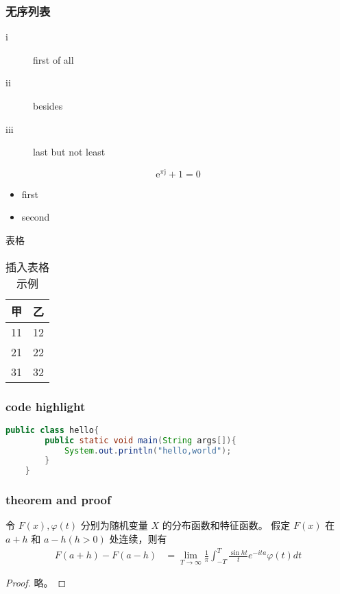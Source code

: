 \documentclass[UTF8]{beamer}
\begin{document}
\begin{frame}
    \frametitle{无序列表}
    \begin{description}
        \item[i] first of all
        \item[ii] besides
        \item[iii] last but not least
    \end{description}
    \begin{equation}
        \text{e}^{\pi \text{j}} + 1 = 0
    \end{equation}
    \begin{itemize}
        \item first
        \item second
    \end{itemize}
\end{frame}

\begin{frame}{表格}
\begin{table}[!hbp]
\centering
\begin{tabular}{c|c}
	\hline
	甲 &乙\\
	\hline
	11 & 12\\
	21 & 22\\
	31 & 32\\
	\hline
\end{tabular}
\caption{插入表格示例}
\label{tab1}
\end{table}
\end{frame}

\begin{frame}[fragile]
    \frametitle{code highlight}
    \begin{lstlisting}[language=java]
    public class hello{
        public static void main(String args[]){
            System.out.println("hello,world");
        }
    }
    \end{lstlisting}
\end{frame}

\begin{frame}
    \frametitle{theorem and proof}
    \begin{theorem}[L\'{e}vy\index{L\'{e}vy 定理}]
    令 $F(x),\varphi(t)$ 分别为随机变量 $X$ 的分布函数和特征函数。
    假定 $F(x)$ 在 $a+h$ 和 $a-h (h>0)$ 处连续，则有
    \begin{align}
    \label{Levy theorem}  %
    F(a+h)-F(a-h)&=\lim_{T\rightarrow\infty}\frac{1}{\pi}\int^{T}_{-T}\frac{\sin ht}{t}
    e^{-ita}\varphi(t)dt
    \end{align}
    \end{theorem}
    \begin{proof}
        略。
    \end{proof}
\end{frame}
\end{document}
